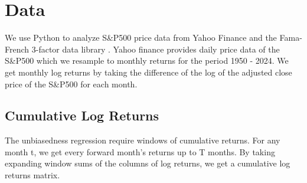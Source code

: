 \section{Data}
\label{sec:data}

We use Python \citep{python3} to analyze S\&P500 price data from Yahoo Finance \citep{yahoo_finance_gspc} and the Fama-French 3-factor data library \citep{french_website}.
Yahoo finance provides daily price data of the S\&P500 which we resample to monthly returns for the period 1950 - 2024. We get monthly log returns by taking the
difference of the log of the adjusted close price of the S\&P500 for each month.

\subsection{Cumulative Log Returns}
The unbiasedness regression require windows of cumulative returns. For any month t, we get every forward month's returns up to T months.
By taking expanding window sums of the columns of log returns, we get a cumulative log returns matrix.




